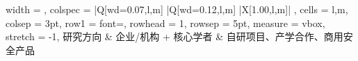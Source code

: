 \begingroup
\enlargethispage{1cm}
\footnotesize
\centering


\begin{longtblr}[
  caption = {通用商用智能体、MCP工具调用协议与端侧硬件隐私计算智能体},
  label   = {tab:commercial_mcp_edge_agent_security},
]{
  width   = \linewidth,
  colspec = {
    |Q[wd=0.07\linewidth,l,m]
    |Q[wd=0.12\linewidth,l,m]
    |X[1.00,l,m]|
  },
  cells   = {l,m},
  colsep  = 3pt,
  row{1}  = {font=\bfseries},
  rowhead = 1,
  rowsep  = 5pt,
  measure = vbox,
  stretch = -1,
}
\hline
研究方向 & 企业/机构 + 核心学者 & 自研项目、产学合作、商用安全产品 \\
\hline


\end{longtblr}
